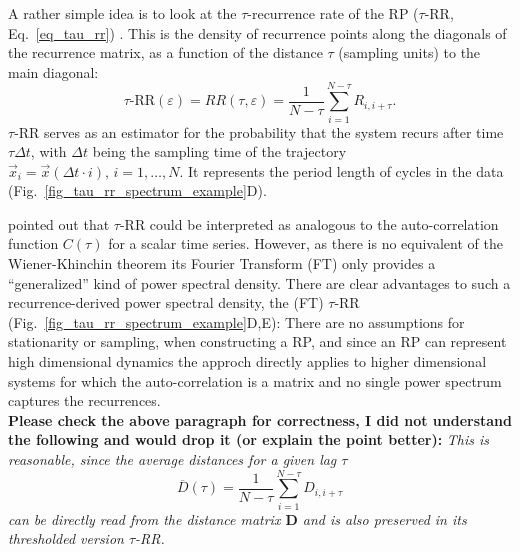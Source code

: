 \documentclass[entropy,article,submit,pdftex,moreauthors]{Definitions/mdpi}
\begin{document}
A rather simple idea is to look at the $\tau$-recurrence rate of the RP ($\tau$-RR, Eq.~\ref{eq_tau_rr}) \cite{marwan2002pla,Zbilut2008}.
This is the density of recurrence points along the diagonals of the recurrence matrix, as a function of the distance $\tau$ (sampling units) to the main diagonal:
\begin{equation}\label{eq_tau_rr}
\tau\text{-RR}(\varepsilon) = RR(\tau, \varepsilon) = \frac{1}{N-\tau} \sum_{i=1}^{N-\tau	} R_{i,i+\tau}.
\end{equation}
$\tau$-RR serves as an estimator for the probability that the system recurs after time $\tau \Delta t$, with $\Delta t$ being the sampling time of the trajectory 
$\vec{x}_i = \vec{x}(\Delta t \cdot i),\, i=1,\ldots,N$. 
It represents the period length of cycles in the data (Fig.~\ref{fig_tau_rr_spectrum_example}D).

\citet{Zbilut2008} pointed out that $\tau$-RR could be interpreted as analogous to the auto-correlation function $C(\tau)$ for a scalar time series.
However, as there is no equivalent of the Wiener-Khinchin theorem its Fourier Transform (FT) only provides a ``generalized'' kind of power spectral density.
There are clear advantages to such a recurrence-derived power spectral density, the (FT) $\tau$-RR (Fig.~\ref{fig_tau_rr_spectrum_example}D,E):
There are no assumptions for stationarity or sampling, when constructing a RP, 
and since an RP can represent high dimensional dynamics the approch directly applies to higher dimensional systems for which the auto-correlation is a matrix and no single power spectrum captures the recurrences.\\

\textbf{Please check the above paragraph for correctness, I did not understand the following and would drop it (or explain the point better):}
\textit{This is reasonable, since the average distances for a given lag $\tau$ 
\begin{equation}
\overline{D}(\tau) = \frac{1}{N-\tau}\sum_{i=1}^{N-\tau} D_{i, i+\tau}
\end{equation}
can be directly read from the distance matrix $\mathbf{D}$ and is also preserved in its thresholded version $\tau$-RR.}
\end{document}
